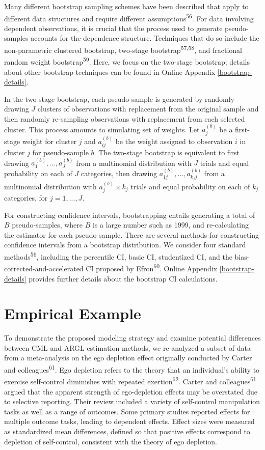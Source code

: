 \documentclass[
  american,
  man, donotrepeattitle,floatsintext]{apa7}
\begin{document}
Many different bootstrap sampling schemes have been described that apply to different data structures and require different assumptions\textsuperscript{56}.
For data involving dependent observations, it is crucial that the process used to generate pseudo-samples accounts for the dependence structure.
Techniques that do so include the non-parametric clustered bootstrap, two-stage bootstrap\textsuperscript{57,58}, and fractional random weight bootstrap\textsuperscript{59}.
Here, we focus on the two-stage bootstrap; details about other bootstrap techniques can be found in Online Appendix \ref{bootstrap-details}.

In the two-stage bootstrap, each pseudo-sample is generated by randomly drawing \(J\) clusters of observations with replacement from the original sample and then randomly re-sampling observations with replacement from each selected cluster.
This process amounts to simulating set of weights. Let \(a_j^{(b)}\) be a first-stage weight for cluster \(j\) and \(a_{ij}^{(b)}\) be the weight assigned to observation \(i\) in cluster \(j\) for pseudo-sample \(b\).
The two-stage bootstrap is equivalent to first drawing \(a_1^{(b)},...,a_J^{(b)}\) from a multinomial distribution with \(J\) trials and equal probability on each of \(J\) categories, then drawing \(a_{1j}^{(b)},...,a_{k_j j}^{(b)}\) from a multinomial distribution with \(a_j^{(b)} \times k_j\) trials and equal probability on each of \(k_j\) categories, for \(j = 1,...,J\).

For constructing confidence intervals, bootstrapping entails generating a total of \(B\) pseudo-samples, where \(B\) is a large number such as 1999, and re-calculating the estimator for each pseudo-sample.
There are several methods for constructing confidence intervals from a bootstrap distribution.
We consider four standard methods\textsuperscript{56}, including the percentile CI, basic CI, studentized CI, and the bias-corrected-and-accelerated CI proposed by Efron\textsuperscript{60}.
Online Appendix \ref{bootstrap-details} provides further details about the bootstrap CI calculations.

\section{Empirical Example}\label{empirical-example}

To demonstrate the proposed modeling strategy and examine potential differences between CML and ARGL estimation methods, we re-analyzed a subset of data from a meta-analysis on the ego depletion effect originally conducted by Carter and colleagues\textsuperscript{61}.
Ego depletion refers to the theory that an individual's ability to exercise self-control diminishes with repeated exertion\textsuperscript{62}.
Carter and colleagues\textsuperscript{61} argued that the apparent strength of ego-depletion effects may be overstated due to selective reporting.
Their review included a variety of self-control manipulation tasks as well as a range of outcomes.
Some primary studies reported effects for multiple outcome tasks, leading to dependent effects.
Effect sizes were measured as standardized mean differences, defined so that positive effects correspond to depletion of self-control, consistent with the theory of ego depletion.
\end{document}
